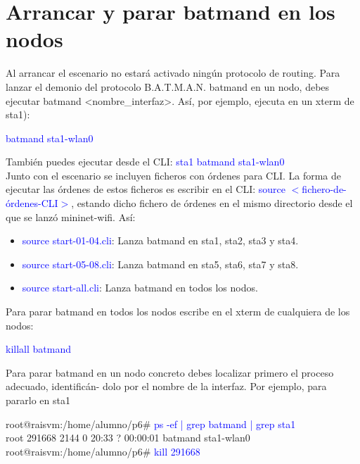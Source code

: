 \documentclass[12pt, a4paper]{report}
\begin{document}
\section*{Arrancar y parar batmand en los nodos}
Al arrancar el escenario no estará activado ningún protocolo de routing. Para lanzar el demonio del
protocolo B.A.T.M.A.N. batmand en un nodo, debes ejecutar batmand <nombre\_interfaz>. Así, por
ejemplo, ejecuta en un xterm de sta1):
\begin{center}
	\textcolor{blue}{batmand sta1-wlan0}
\end{center}
También puedes ejecutar desde el CLI: \textcolor{blue}{sta1 batmand sta1-wlan0}\\
Junto con el escenario se incluyen ficheros con órdenes para CLI. La forma de ejecutar las órdenes
de estos ficheros es escribir en el CLI: \textcolor{blue}{source $<$fichero-de-órdenes-CLI$>$}, estando dicho fichero de
órdenes en el mismo directorio desde el que se lanzó mininet-wifi. Así:
\begin{itemize}
	\item \textcolor{blue}{source start-01-04.cli}: Lanza batmand en sta1, sta2, sta3 y sta4.
	\item \textcolor{blue}{source start-05-08.cli}: Lanza batmand en sta5, sta6, sta7 y sta8.
	\item \textcolor{blue}{source start-all.cli}: Lanza batmand en todos los nodos.
\end{itemize}
Para parar batmand en todos los nodos escribe en el xterm de cualquiera de los nodos:
\begin{center}
	\textcolor{blue}{killall batmand}
\end{center}
Para parar batmand en un nodo concreto debes localizar primero el proceso adecuado, identificán-
dolo por el nombre de la interfaz. Por ejemplo, para pararlo en sta1
\begin{center}
	root@raisvm:/home/alumno/p6\# \textcolor{blue}{ps -ef | grep batmand | grep sta1}\\
	root	291668	2144 0 20:33 ?		00:00:01 batmand sta1-wlan0\\
	root@raisvm:/home/alumno/p6\# \textcolor{blue}{kill 291668}
\end{center}
\end{document}
